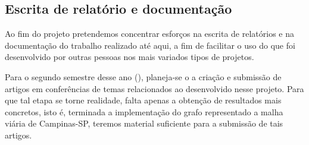 \subsection{Escrita de relatório e documentação}
Ao fim do projeto pretendemos concentrar esforços na escrita de relatórios e na documentação do trabalho realizado até aqui, a fim de facilitar o uso do que foi desenvolvido por outras pessoas nos mais variados tipos de projetos.

Para o segundo semestre desse ano (\the\year), planeja-se o a criação e submissão de artigos em conferências de temas relacionados ao desenvolvido nesse projeto. Para que tal etapa se torne realidade, falta apenas a obtenção de resultados mais concretos, isto é, terminada a implementação do grafo representado a malha viária de Campinas-SP, teremos material suficiente para a submissão de tais artigos.
